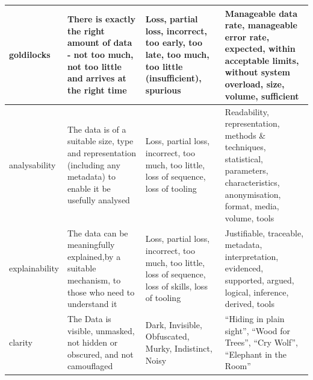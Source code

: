 \begin{longtable}{|L{}|L{}|L{}|L{}|}
  \hline
  \Gls{goldilocks} &
  There is exactly the right amount of data - not too much, not too little and arrives at the right time &
  {Loss, partial loss, incorrect, too early, too late, too much, too little (insufficient), spurious} &
  Manageable data rate, manageable error rate, expected, within acceptable limits, without system overload, size, volume, sufficient\\
  \hline
  \Gls{analysability} &
  The data is of a suitable size, type and representation (including any \gls{metadata}) to enable it be usefully analysed &
  {Loss, partial loss, incorrect, too much, too little, loss of sequence, loss of tooling} &
  Readability, representation, methods \& techniques, statistical, parameters, characteristics, anonymisation, \gls{format}, media, volume, tools
  \\
  \hline
  \Gls{explainability} &
  The data can be meaningfully explained,by a suitable mechanism, to those who need to understand it &
  {Loss, partial loss, incorrect, too much, too little, loss of sequence, loss of skills, loss of tooling} &
  Justifiable, traceable, \gls{metadata}, interpretation, evidenced, supported, argued, logical, inference, derived, tools
  \\
  \hline
  \Gls{clarity} &
  The Data is visible, unmasked, not hidden or obscured, and not camouflaged &
  Dark, Invisible, Obfuscated, Murky, Indistinct, Noisy & ``Hiding in plain sight'', ``Wood for Trees'', ``Cry Wolf'', ``Elephant in the Room''
  \\
  \hline
\end{longtable}
